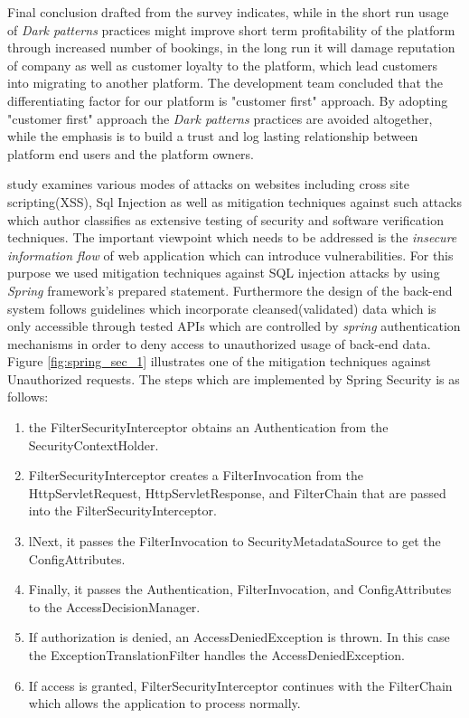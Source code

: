 Final conclusion drafted from the survey indicates, while in the short run usage of \textit{Dark patterns} practices might improve short term profitability of the platform through increased number of bookings, in the long run it will damage reputation of company as well as customer loyalty to the platform, which lead customers into migrating to another platform. The development team concluded that the differentiating factor for our platform is "customer first" approach. By adopting "customer first" approach the \textit{Dark patterns} practices are avoided altogether, while the emphasis is to build a trust and log lasting relationship between platform end users and the platform owners.




\citeauthor{web_security} study \cite{web_security} examines various modes of attacks on websites including cross site scripting(XSS), Sql Injection as well as mitigation techniques against such attacks which author classifies as extensive testing of security and software verification techniques. The important viewpoint which needs to be addressed is the \textit{insecure information flow} of web application which can introduce vulnerabilities.  
For this purpose we used mitigation techniques against SQL injection attacks by using \textit{Spring} framework's prepared statement. Furthermore the design of the back-end system follows guidelines which incorporate cleansed(validated) data which is only accessible through tested APIs which are controlled by \textit{spring} authentication mechanisms in order to deny access to unauthorized usage of back-end data.  
Figure \ref{fig:spring_sec_1} illustrates one of the mitigation techniques against Unauthorized requests.
The steps which are implemented by Spring Security is as follows:

\begin{enumerate}
  \item the FilterSecurityInterceptor obtains an Authentication from the SecurityContextHolder.
  \item FilterSecurityInterceptor creates a FilterInvocation from the HttpServletRequest, HttpServletResponse, and FilterChain that are passed into the FilterSecurityInterceptor.
  \item lNext, it passes the FilterInvocation to SecurityMetadataSource to get the ConfigAttributes.
  \item Finally, it passes the Authentication, FilterInvocation, and ConfigAttributes to the AccessDecisionManager.
  \item If authorization is denied, an AccessDeniedException is thrown. In this case the ExceptionTranslationFilter handles the AccessDeniedException.
  \item If access is granted, FilterSecurityInterceptor continues with the FilterChain which allows the application to process normally.
\end{enumerate}
  

